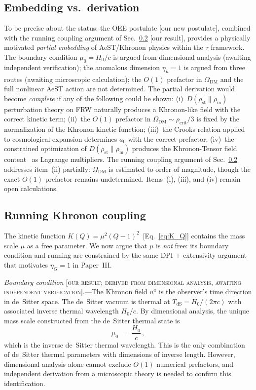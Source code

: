\documentclass[prd,twocolumn,superscriptaddress,longbibliography,floatfix]{revtex4-2}
\newcommand{\tauasym}{\tau}
\newcommand{\rhost}{\rho_{\mathrm{st}}}
\newcommand{\rhom}{\rho_{\mathrm{m}}}
\newcommand{\OmDM}{\Omega_{\mathrm{DM}}}
\begin{document}
\subsection{Embedding vs.\ derivation}

To be precise about the status: the OEE postulate
[our new postulate], combined with the running coupling
argument of Sec.~\ref{sec:running_mu} [our result],
provides a physically motivated \emph{partial embedding}
of AeST/Khronon physics within the $\tauasym$ framework.
The boundary condition $\mu_0 = H_0/c$ is argued from
dimensional analysis (awaiting independent verification);
the anomalous dimension $\eta_\mu = 1$ is argued from
three routes (awaiting microscopic calculation); the
$O(1)$ prefactor in $\OmDM$ and the full nonlinear AeST
action are not determined.
The partial derivation would become \emph{complete} if
any of the following could be shown:
(i)~$D(\rhost\|\rhom)$ perturbation theory on FRW
naturally produces a Khronon-like field with the
correct kinetic term;
(ii)~the $O(1)$ prefactor in
$\OmDM \sim \rho_{\mathrm{crit}}/3$ is fixed by the
normalization of the Khronon kinetic function;
(iii)~the Crooks relation applied to cosmological
expansion determines $a_0$ with the correct prefactor;
(iv)~the constrained optimization of
$D(\rhost\|\rhom)$ produces the Khronon-Tensor field
content~\cite{BlanchetSkordis2025} as Lagrange
multipliers.
The running coupling argument of
Sec.~\ref{sec:running_mu} addresses item~(ii) partially:
$\OmDM$ is estimated to order of magnitude, though the
exact $O(1)$ prefactor remains undetermined.  Items~(i),
(iii), and (iv) remain open calculations.


\subsection{Running Khronon coupling}
\label{sec:running_mu}

The kinetic function
$K(Q) = \mu^2(Q-1)^2$~[Eq.~\eqref{eq:K_Q}] contains
the mass scale $\mu$ as a free parameter.  We now argue
that $\mu$ is \emph{not} free: its boundary condition
and running are constrained by the same DPI $+$
extensivity argument that motivates $\eta_G = 1$ in
Paper~III.

\emph{Boundary condition} [\textsc{our result;
derived from dimensional analysis, awaiting independent
verification}].---The Khronon field $u^a$ is the
observer's time direction in de~Sitter space.  The
de~Sitter vacuum is thermal at
$T_{\mathrm{dS}} = H_0/(2\pi c)$ with associated
inverse thermal wavelength $H_0/c$.  By dimensional
analysis, the unique mass scale constructed from the
de~Sitter thermal state is
\begin{equation}
\mu_0 \;=\; \frac{H_0}{c}\,,
\label{eq:mu0}
\end{equation}
which is the inverse de~Sitter thermal wavelength.
This is the only combination of de~Sitter thermal
parameters with dimensions of inverse length.  However,
dimensional analysis alone cannot exclude $O(1)$
numerical prefactors, and independent derivation from
a microscopic theory is needed to confirm this
identification.
\end{document}
